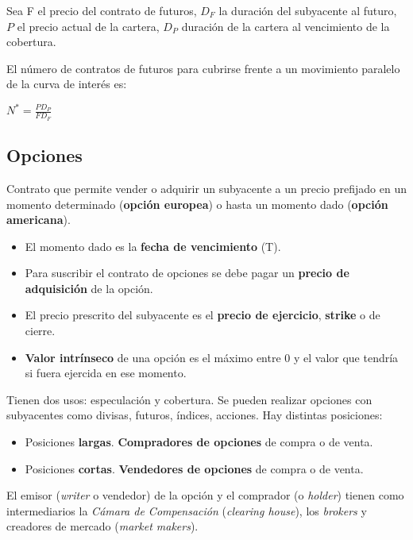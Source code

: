 \documentclass[
10pt, %
a4paper, %
oneside, %
headinclude,footinclude, %
BCOR5mm, %
]{scrartcl}
\newcommand{\n}[1]{\textbf{#1}}
\newcommand{\cur}[1]{\textit{#1}}
\newcommand{\sub}[1]{_{#1}}
\newcommand{\pot}[1]{^{#1}}
\newcommand{\f}[1]{{\large{${#1}$}}}
\newcounter{ex}
\begin{document}
			Sea F el precio del contrato de futuros, \f{D\sub{F}} la duración del subyacente al futuro, \f{P} el precio actual de la cartera, \f{D\sub{P}} duración de la cartera al vencimiento de la cobertura.

			El número de contratos de futuros para cubrirse frente a un movimiento paralelo de la curva de interés es:
			\begin{center} \f{N\pot{*} = \frac{PD\sub{P}}{FD\sub{F}}} \end{center}

		\newpage

	\subsection{Opciones}

		Contrato que permite vender o adquirir un subyacente a un precio prefijado en un momento determinado (\n{opción europea}) o hasta un momento dado (\n{opción americana}). 
		\begin{itemize}
			\item El momento dado es la \n{fecha de vencimiento} (T).
			\item Para suscribir el contrato de opciones se debe pagar un \n{precio de adquisición} de la opción.
			\item El precio prescrito del subyacente es el \n{precio de ejercicio}, \n{strike} o de cierre.
			\item \n{Valor intrínseco} de una opción es el máximo entre 0 y el valor que tendría si fuera ejercida en ese momento.
		\end{itemize}

		Tienen dos usos: especulación y cobertura. Se pueden realizar opciones con subyacentes como divisas, futuros, índices, acciones. Hay distintas posiciones:
		\begin{itemize}
			\item Posiciones \n{largas}. \n{Compradores de opciones} de compra o de venta.
			\item Posiciones \n{cortas}. \n{Vendedores de opciones} de compra o de venta.
		\end{itemize}

		El emisor (\cur{writer} o vendedor) de la opción y el comprador (o \cur{holder}) tienen como intermediarios la \cur{Cámara de Compensación} (\cur{clearing house}), los \cur{brokers} y creadores de mercado (\cur{market makers}).
		\vspace{-0.3cm}
\end{document}
